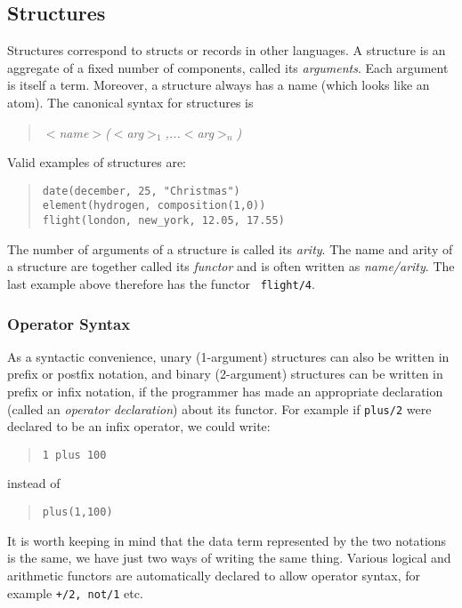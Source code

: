 \subsection{Structures} 

 
Structures correspond to structs or records in other languages.  A
structure is an aggregate of a fixed number of components, called its
{\em arguments}. Each argument is itself a term.  Moreover, a
structure always has a name (which looks like an atom).  The canonical
syntax for structures is
\begin{quotation}
{\it $<$name$>$($<$arg$>_{1}$,...$<$arg$>_{n}$)}
\end{quotation}
Valid examples of structures are:
\begin{quote}\begin{verbatim}
date(december, 25, "Christmas")
element(hydrogen, composition(1,0))
flight(london, new_york, 12.05, 17.55)
\end{verbatim}\end{quote}
 The number of arguments of a structure is called its {\em
arity}.   The name and arity of a structure are
together called its {\em functor} and is often written as {\em
name/arity}.  The last example above therefore has the functor {\tt
flight/4}.


\subsubsection{Operator Syntax} 
As a syntactic convenience, unary (1-argument) structures can also be written
in prefix or postfix notation, and binary (2-argument) structures can be
written in prefix or infix notation, if the programmer has made an
appropriate declaration (called an {\em operator declaration})
about its functor.  For example if {\tt plus/2} were declared to
be an infix operator, we could write:
\begin{quote}\begin{verbatim}
1 plus 100
\end{verbatim}\end{quote}
instead of
\begin{quote}\begin{verbatim}
plus(1,100)
\end{verbatim}\end{quote}
It is worth keeping in mind that the data term represented by the
two notations is the same, we have just two ways of writing the same thing.
Various logical and arithmetic functors are automatically declared to
allow operator syntax, for example {\tt +/2, not/1} etc.

